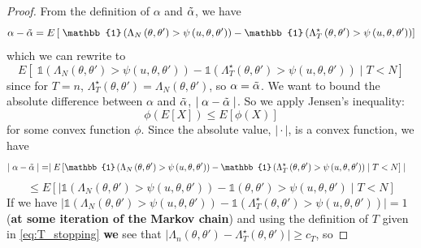 \begin{proof} From the definition of $\alpha$ and $\Tilde{\alpha}$, we have 
\begin{equation*}
\alpha - \Tilde{\alpha} = E\left[\; \mathbb{1}\left(\Lambda_N\left(\theta, \theta'\right) > \psi\left(u, \theta, \theta'\right)\right) - \mathbb{1}\left(\Lambda_T^{\star}\left(\theta, \theta'\right) > \psi\left(u, \theta, \theta'\right)\right)\right]    
\end{equation*}
which we can rewrite to
\begin{equation*}
    E\left[\; \mathbb{1}\left(\Lambda_N\left(\theta, \theta'\right) > \psi\left(u, \theta, \theta'\right)\right) - \mathbb{1}\left(\Lambda_T^{\star}\left(\theta,\theta'\right) > \psi\left(u, \theta, \theta'\right)\right)\mid T < N \right] 
\end{equation*}
since for $T = n$, $\Lambda_T^{\star}\left(\theta, \theta'\right) = \Lambda_N\left(\theta, \theta'\right)$, so  $\alpha = \Tilde{\alpha}$. We want to bound the absolute difference between $\alpha$ and $\Tilde{\alpha}$, $\mid \alpha - \Tilde{\alpha}\mid$. So we apply Jensen's inequality: 
\begin{equation}\label{eq:jensen}
\phi\left(E\left[X\right] \right) \leq E\left[\phi\left(X\right)\right] 
\end{equation}
for some convex function $\phi$. Since the absolute value, $\mid \cdot\mid$, is a convex function, we have  
\begin{equation*}
\begin{split}
\mid \alpha - \Tilde{\alpha}\mid &= 
    \mid E\left[\mathbb{1}\left(\Lambda_N\left(\theta, \theta'\right) > \psi \left(u, \theta, \theta'\right)\right) - \mathbb{1}\left(\Lambda_T^{\star}\left(\theta, \theta'\right) > \psi\left(u, \theta, \theta'\right)\right)\mid T < N\right]\mid 
    \end{split}
\end{equation*}
\begin{equation*}
    \leq E\left[\mid \mathbb{1}\left(\Lambda_N\left(\theta, \theta'\right) > \psi\left(u, \theta, \theta'\right)\right) - \mathbb{1}\left(\theta, \theta'\right) > \psi\left(u, \theta, \theta'\right)\mid T<  N\right]
\end{equation*}
If we have $\mid \mathbb{1}\left(\Lambda_N\left(\theta, \theta'\right) > \psi\left(u, \theta, \theta'\right)\right) - \mathbb{1}\left(\Lambda_T^{\star}\left(\theta, \theta'\right) > \psi\left(u, \theta, \theta'\right)\right)\mid = 1$ (\textbf{at some iteration of the Markov chain}) and using the definition of $T$ given in \eqref{eq:T_stopping} \textbf{we} see that $\mid \Lambda_n\left(\theta, \theta'\right) - \Lambda_T^{\star}\left(\theta, \theta'\right) \mid \geq c_T$, so

\end{proof}
